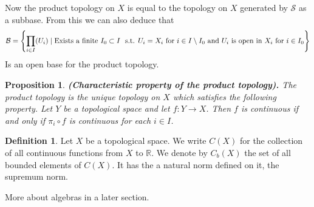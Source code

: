 \documentclass[11pt,a4paper]{article}
\theoremstyle{definition}
\newtheorem{definition}{Definition}[section]
\theoremstyle{plain}
\newtheorem{proposition}[theorem]{Proposition}
\newcommand{\st}{\text{ s.t. }}
\newcommand{\R}{\mathbb{R}}
\newcommand{\set}[2]{ \left\{ #1 \mid #2 \right\} }
\renewcommand{\tt}[1]{\textnormal{\textbf{(#1).}}} %
\begin{document}
	Now the product topology on $X$ is equal to the topology on $X$ generated
	by $\mathcal{S}$ as a subbase. From this we can also deduce that
  {\small
  \[
		\mathcal{B} = \set{\prod_{i \in I}(U_i)}{\text{Exists a finite
		$I_0 \subset I$ \st $U_i = X_i$ for $i \in I \setminus I_0$ and
		$U_i$ is open in $X_i$ for $i \in I_0$}}
	\]
  }
	Is an open base for the product topology.
	\begin{proposition}
		\tt{Characteristic property of the product topology}
		The product topology is the unique topology on $X$ which satisfies the 
		following property. Let $Y$ be a topological space and let 
		$f \colon Y \to X$. Then $f$ is continuous if and only if 
		$\pi_i \circ f$ is continuous for each $i \in I$.
	\end{proposition}
	\begin{definition}
		Let $X$ be a topological space. We write $C(X)$ for the collection of 
		all continuous functions from $X$ to $\R$. We denote by $C_b(X)$ the set 
		of all bounded elements of $C(X)$. It has the a natural norm defined on
		it, the supremum norm.
	\end{definition}
	More about algebras in a later section.
	
	\newpage
	
\end{document}
